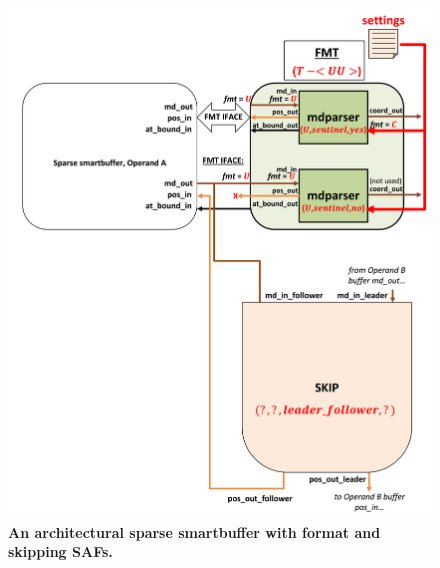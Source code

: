 \begin{figure}[H]
\includegraphics[width=\textwidth]{figures/safinference_build_06mdparserstratcust.png}
\caption{\textbf{An architectural sparse smartbuffer with format and skipping SAFs.}}
\label{fig:safinference_build_06mdparserstratcust}
\centering
\end{figure}




